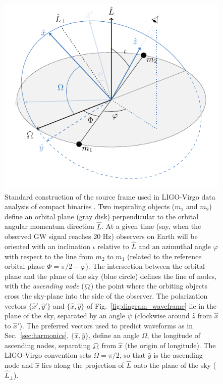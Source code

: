 \documentclass[aps,prd,twocolumn,superscriptaddress,preprintnumbers,floatfix,nofootinbib]{revtex4-2}
\begin{document}
\begin{figure}
\includegraphics[width=0.9\columnwidth]{diagram_sourceframe.pdf}
\caption{Standard construction of the source frame used in LIGO-Virgo data analysis of compact binaries \cite{LALSuite:source}. Two inspiraling objects ($m_1$ and $m_2$) define an orbital plane (gray disk) perpendicular to the orbital angular momentum direction $\hat{L}$. At a given time (say, when the observed GW signal reaches 20 Hz) observers on Earth will be oriented with an inclination $\iota$ relative to $\hat{L}$ and an azimuthal angle $\varphi$ with respect to the line from $m_2$ to $m_1$ (related to the reference orbital phase $\Phi=\pi/2-\varphi$).
The intersection between the orbital plane and the plane of the sky (blue circle) defines the line of nodes, with the \emph{ascending node} ($\ascnode$) the point where the orbiting objects cross the sky-plane into the side of the observer.
The polarization vectors $\{\hat{x}',\hat{y}'\}$ and $\{\hat{x},\hat{y}\}$ of Fig.~\ref{fig:diagram_waveframe} lie in the plane of the sky, separated by an angle $\psi$ (clockwise around $\hat{z}$ from $\hat{x}$ to $\hat{x}'$).
The preferred vectors used to predict waveforms as in Sec.~\ref{sec:harmonics}, $\{\hat{x},\hat{y}\}$, define an angle $\Omega$, the longitude of ascending nodes, separating $\ascnode$ from $\hat{x}$ (the origin of longitude).
The LIGO-Virgo convention sets $\Omega=\pi/2$, so that $\hat{y}$ is the ascending node and $\hat{x}$ lies along the projection of $\hat{L}$ onto the plane of the sky ($\hat{L}_\perp$).
}
\label{fig:diagram_sourceframe}
\end{figure}
\end{document}
